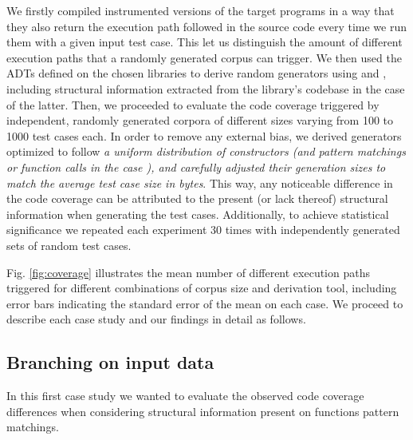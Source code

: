 We firstly compiled instrumented versions of the target programs in a way that
they also return the execution path followed in the source code every time we
run them with a given input test case.
%
This let us distinguish the amount of different execution paths that a randomly
generated corpus can trigger.
%
We then used the ADTs defined on the chosen libraries to derive random
generators using \dragen and \dragenp, including structural information
extracted from the library's codebase in the case of the latter.
%
Then, we proceeded to evaluate the code coverage triggered by independent,
randomly generated corpora of different sizes varying from 100 to 1000 test
cases each.
%
In order to remove any external bias, we derived generators optimized to follow
\emph{a uniform distribution of constructors (and pattern matchings or function
  calls in the case \dragenp), and carefully adjusted their generation sizes to
  match the average test case size in bytes}.
%
This way, any noticeable difference in the code coverage can be attributed to
the present (or lack thereof) structural information when generating the test
cases.
%
Additionally, to achieve statistical significance we repeated each experiment 30
times with independently generated sets of random test cases.

\begin{figure*}[t]
  \centering
  
  \hspace{5pt}%
  
  \caption{Path coverage comparison between \dragen (\ref{exp:dragen}) and
    \dragenp (\ref{exp:dragenp}). }
  \label{fig:coverage}
\end{figure*}
%
Fig. \ref{fig:coverage} illustrates the mean number of different execution paths
triggered for different combinations of corpus size and derivation tool,
including error bars indicating the standard error of the mean on each case.
%
We proceed to describe each case study and our findings in detail as follows.

\subsection{Branching on input data}

In this first case study we wanted to evaluate the observed code coverage
differences when considering structural information present on functions pattern
matchings.


